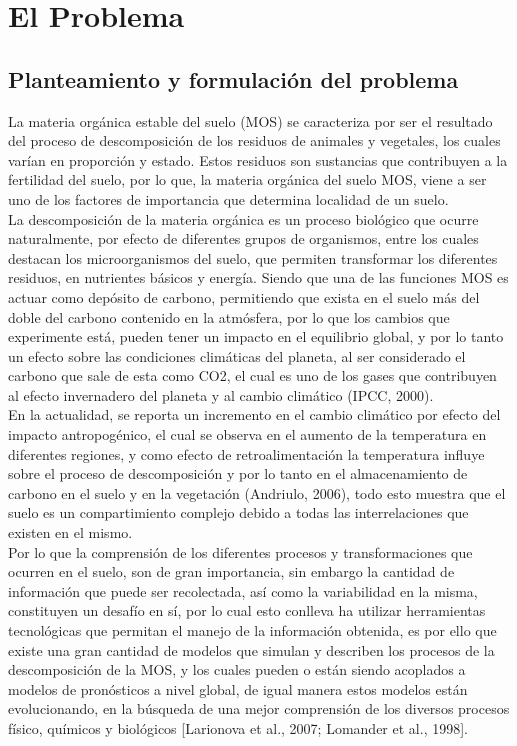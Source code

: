 \chapter{El Problema}

\section{Planteamiento y formulaci\'on del problema}
La materia orgánica estable del suelo (MOS) se caracteriza por ser el resultado del proceso de descomposición de los residuos de animales y vegetales, los cuales varían en proporción y estado. Estos residuos son sustancias que contribuyen a la fertilidad del suelo, por lo que,  la materia org\'anica del suelo MOS, viene a ser uno de los factores de importancia que determina localidad de un suelo.\\

La descomposición de la materia orgánica es un proceso biológico que ocurre naturalmente, por efecto de diferentes grupos de organismos, entre los cuales destacan los microorganismos del suelo, que permiten transformar los diferentes residuos, en nutrientes básicos y energía. Siendo que una de las funciones MOS es actuar como depósito de carbono, permitiendo que exista en el suelo más del doble del carbono contenido en la atmósfera, por lo que los cambios que experimente está, pueden tener un impacto en el equilibrio global, y por lo tanto un efecto sobre las condiciones climáticas del planeta, al ser considerado el carbono que sale de esta como CO2, el cual es uno de los gases que contribuyen al efecto invernadero del planeta y al cambio climático (IPCC, 2000).\\

En la actualidad, se reporta un incremento en el cambio climático por efecto del impacto antropogénico, el cual se observa en el aumento de la temperatura en diferentes regiones, y como efecto de retroalimentación la temperatura influye sobre el proceso de descomposición y por lo tanto en el almacenamiento de carbono en el suelo y en la vegetación (Andriulo, 2006), todo esto muestra que el suelo es un compartimiento complejo debido a todas las interrelaciones que existen en el mismo.\\

Por lo que la comprensión de los diferentes procesos y transformaciones que ocurren en el suelo, son de gran importancia, sin embargo la cantidad de información que puede ser recolectada, así como la variabilidad en la misma, constituyen un desafío en sí, por lo cual esto conlleva ha utilizar herramientas tecnológicas que permitan el manejo de la información obtenida, es por ello que existe una gran cantidad de modelos que simulan y describen los procesos de la descomposición de la MOS, y los cuales pueden o están siendo acoplados a modelos de pronósticos a nivel global, de igual manera estos modelos están evolucionando, en la búsqueda de una mejor comprensión de los diversos procesos físico, químicos y biológicos [Larionova et al., 2007; Lomander et al., 1998].\\

